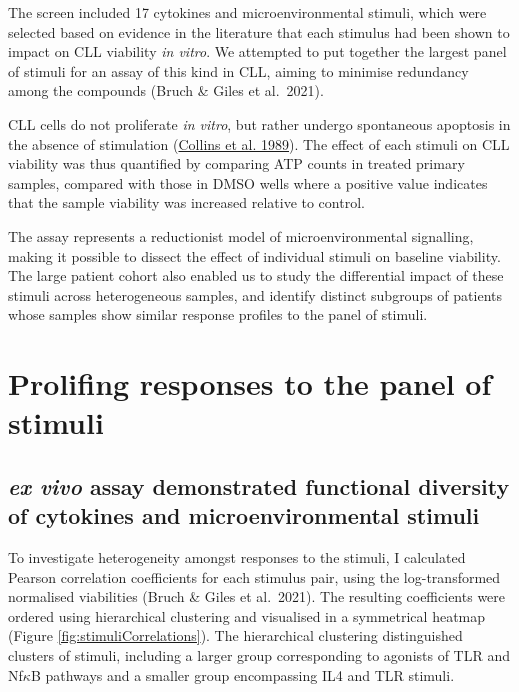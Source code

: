 \documentclass[11pt, a4paper, twosided]{book}
\begin{document}
The screen included 17 cytokines and microenvironmental stimuli, which were selected based on evidence in the literature that each stimulus had been shown to impact on CLL viability \emph{in vitro}. We attempted to put together the largest panel of stimuli for an assay of this kind in CLL, aiming to minimise redundancy among the compounds (Bruch \& Giles et al.~2021).

CLL cells do not proliferate \emph{in vitro}, but rather undergo spontaneous apoptosis in the absence of stimulation (\protect\hyperlink{ref-Collins1989}{Collins et al. 1989}). The effect of each stimuli on CLL viability was thus quantified by comparing ATP counts in treated primary samples, compared with those in DMSO wells where a positive value indicates that the sample viability was increased relative to control.

The assay represents a reductionist model of microenvironmental signalling, making it possible to dissect the effect of individual stimuli on baseline viability. The large patient cohort also enabled us to study the differential impact of these stimuli across heterogeneous samples, and identify distinct subgroups of patients whose samples show similar response profiles to the panel of stimuli.

\hypertarget{prolifing-responses-to-the-panel-of-stimuli}{%
\section{Prolifing responses to the panel of stimuli}\label{prolifing-responses-to-the-panel-of-stimuli}}

\hypertarget{ex-vivo-assay-demonstrated-functional-diversity-of-cytokines-and-microenvironmental-stimuli}{%
\subsection{\texorpdfstring{\emph{ex vivo} assay demonstrated functional diversity of cytokines and microenvironmental stimuli}{ex vivo assay demonstrated functional diversity of cytokines and microenvironmental stimuli}}\label{ex-vivo-assay-demonstrated-functional-diversity-of-cytokines-and-microenvironmental-stimuli}}

To investigate heterogeneity amongst responses to the stimuli, I calculated Pearson correlation coefficients for each stimulus pair, using the log-transformed normalised viabilities (Bruch \& Giles et al.~2021). The resulting coefficients were ordered using hierarchical clustering and visualised in a symmetrical heatmap (Figure \ref{fig:stimuliCorrelations}). The hierarchical clustering distinguished clusters of stimuli, including a larger group corresponding to agonists of TLR and Nf\(\kappa\)B pathways and a smaller group encompassing IL4 and TLR stimuli.
\end{document}

